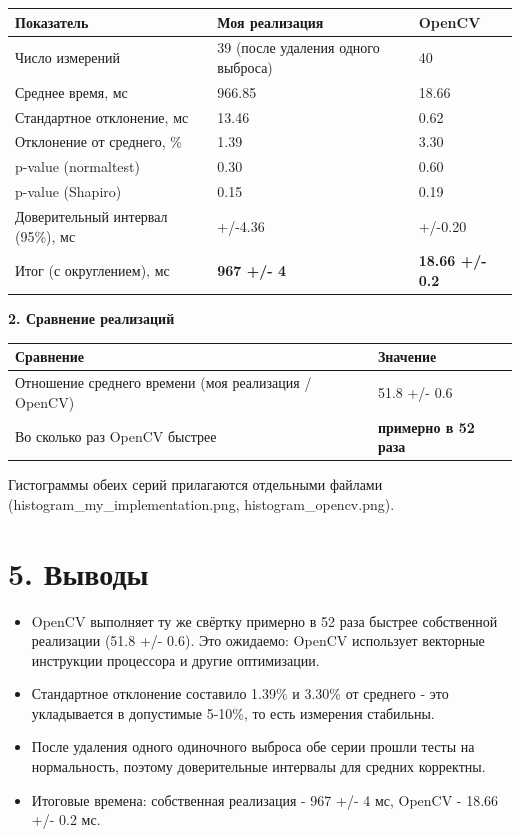 \documentclass[12pt,a4paper]{article}
\begin{document}
\begin{center}
\begin{tabular}{|p{6.2cm}|p{5cm}|p{3.2cm}|}
\hline
\textbf{Показатель} & \textbf{Моя реализация} & \textbf{OpenCV} \\
\hline
Число измерений & 39 (после удаления одного выброса) & 40 \\
\hline
Среднее время, мс & 966.85 & 18.66 \\
\hline
Стандартное отклонение, мс & 13.46 & 0.62 \\
\hline
Отклонение от среднего, \% & 1.39 & 3.30 \\
\hline
p-value (normaltest) & 0.30 & 0.60 \\
\hline
p-value (Shapiro) & 0.15 & 0.19 \\
\hline
Доверительный интервал (95\%), мс & +/-4.36 & +/-0.20 \\
\hline
Итог (с округлением), мс & \textbf{967 +/- 4} & \textbf{18.66 +/- 0.2} \\
\hline
\end{tabular}
\end{center}

\textbf{2. Сравнение реализаций}

\begin{center}
\begin{tabular}{|p{10cm}|p{4.5cm}|}
\hline
\textbf{Сравнение} & \textbf{Значение} \\
\hline
Отношение среднего времени (моя реализация / OpenCV) & 51.8 +/- 0.6 \\
\hline
Во сколько раз OpenCV быстрее & \textbf{примерно в 52 раза} \\
\hline
\end{tabular}
\end{center}

Гистограммы обеих серий прилагаются отдельными файлами (histogram\_my\_implementation.png, histogram\_opencv.png).

\section*{5. Выводы}

\begin{itemize}
    \item OpenCV выполняет ту же свёртку примерно в 52 раза быстрее собственной реализации (51.8 +/- 0.6). Это ожидаемо: OpenCV использует векторные инструкции процессора и другие оптимизации.
    \item Стандартное отклонение составило 1.39\% и 3.30\% от среднего - это укладывается в допустимые 5-10\%, то есть измерения стабильны.
    \item После удаления одного одиночного выброса обе серии прошли тесты на нормальность, поэтому доверительные интервалы для средних корректны.
    \item Итоговые времена: собственная реализация - 967 +/- 4 мс, OpenCV - 18.66 +/- 0.2 мс.
\end{itemize}
\end{document}
